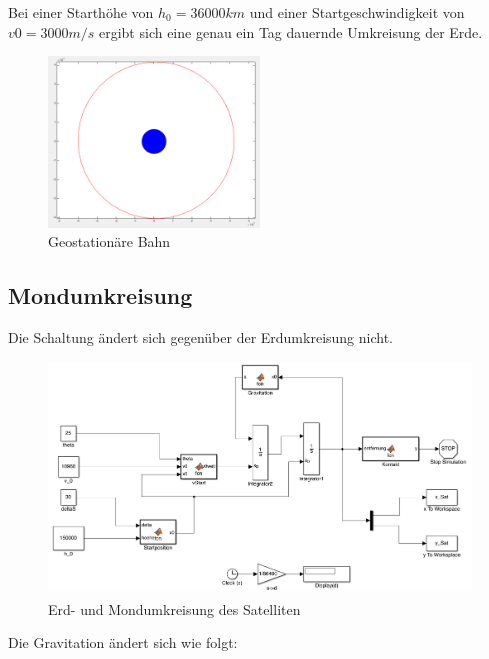 \documentclass[10pt,a4paper]{article}
\begin{document}
Bei einer Starthöhe von $h_0 = 36000 km$ und einer Startgeschwindigkeit von $v0 = 3000 m/s$ ergibt sich eine genau ein Tag dauernde Umkreisung der Erde.
	
	\begin{figure}[H]
		\centering
		\includegraphics[width=0.5\textwidth]{../aufgabe1/screens/1c.png}
		\caption{Geostationäre Bahn}
	\end{figure}


\subsection{Mondumkreisung}

Die Schaltung ändert sich gegenüber der Erdumkreisung nicht.

	\begin{figure}[H]
		\centering
		\includegraphics[width=1\textwidth]{../aufgabe12/screens/simulink_mond.png}
		\caption{Erd- und Mondumkreisung des Satelliten}
	\end{figure}

Die Gravitation ändert sich wie folgt:
\end{document}
